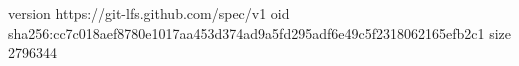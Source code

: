 version https://git-lfs.github.com/spec/v1
oid sha256:cc7c018aef8780e1017aa453d374ad9a5fd295adf6e49c5f2318062165efb2c1
size 2796344
